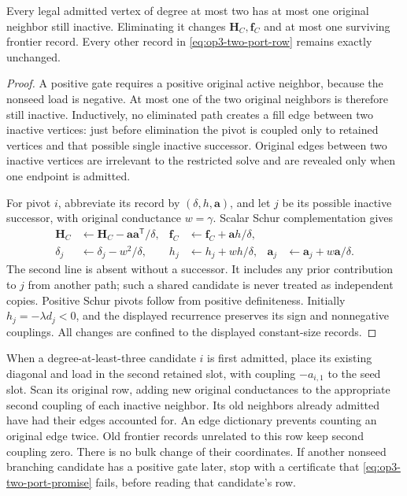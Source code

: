 \begin{lemma}
\label{lem:op3-two-port-stability}
Every legal admitted vertex of degree at most two has at most one original
neighbor still inactive. Eliminating it changes $\bm H_C,\bm f_C$ and at most one
surviving frontier record. Every other record in
\cref{eq:op3-two-port-row} remains exactly unchanged.
\end{lemma}
\begin{proof}
A positive gate requires a positive original active neighbor, because the
nonseed load is negative. At most one of the two original neighbors is
therefore still inactive. Inductively, no eliminated path creates a fill
edge between two inactive vertices: just before elimination the pivot is
coupled only to retained vertices and that possible single inactive
successor. Original edges between two inactive vertices are irrelevant to
the restricted solve and are revealed only when one endpoint is admitted.

For pivot $i$, abbreviate its record by $(\delta,h,\bm a)$, and let $j$
be its possible inactive successor, with original conductance $w=\gamma$.
Scalar Schur complementation gives
\begin{align}
 \bm H_C&\leftarrow \bm H_C-\bm a\bm a^{\mathsf T}/\delta,
 & \bm f_C&\leftarrow \bm f_C+\bm a h/\delta,
 \label{eq:op3-two-port-core-update}\\
 \delta_j&\leftarrow\delta_j-w^2/\delta,
 & h_j&\leftarrow h_j+wh/\delta,
 & \bm a_j&\leftarrow\bm a_j+w\bm a/\delta.
 \label{eq:op3-two-port-frontier-update}
\end{align}
The second line is absent without a successor. It includes any prior
contribution to $j$ from another path; such a shared candidate is never
treated as independent copies. Positive Schur pivots follow from positive
definiteness. Initially $h_j=-\lambda d_j<0$, and the displayed recurrence
preserves its sign and nonnegative couplings. All changes are confined to
the displayed constant-size records.
\end{proof}

When a degree-at-least-three candidate $i$ is first admitted, place its
existing diagonal and load in the second retained slot, with coupling
$-a_{i,1}$ to the seed slot. Scan its original row, adding new original
conductances to the appropriate second coupling of each inactive neighbor.
Its old neighbors already admitted have had their edges accounted for.
An edge dictionary prevents counting an original edge twice. Old frontier
records unrelated to this row keep second coupling zero. There is no bulk
change of their coordinates. If another nonseed branching candidate has a
positive gate later, stop with a certificate that
\cref{eq:op3-two-port-promise} fails, before reading that candidate's row.

